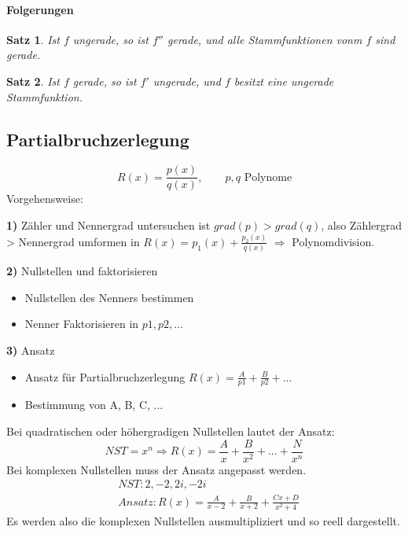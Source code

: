 \documentclass[12pt,a4paper]{article}%
\let\harvardleftorig\harvardleft
\newtheorem{satz}{Satz}[section]
\numberwithin{equation}{section}
\newcommand{\subsubsubsection}{\paragraph}
\newcommand\citevgl
{\def\harvardleft{(vgl.\ \global\let\harvardleft\harvardleftorig}%
 \cite
}
\numberwithin{equation}{subsection}
\begin{document}
\subsubsubsection{Folgerungen}
\begin{satz}
Ist $f$ ungerade, so ist $f''$ gerade, und alle Stammfunktionen vonm $f$ sind gerade.\citevgl{HM2Vortragsubung}
\end{satz}
\begin{satz}
Ist $f$ gerade, so ist $f'$ ungerade, und $f$ besitzt eine ungerade Stammfunktion.\citevgl{HM2Vortragsubung}
\end{satz}

\subsection{Partialbruchzerlegung}
	\begin{equation}
	  R(x) = \frac{p(x)}{q(x)}, \qquad p,q\text{ Polynome}
	\end{equation}
	Vorgehensweise:
	\begin{description}
	  \item{\textbf{1)}} Zähler und Nennergrad untersuchen\newline
	  ist $grad(p) > grad(q)$, also Zählergrad > Nennergrad umformen in  \newline$R(x) = p_1(x) + \frac{p_2(x)}{q(x)}$ $\Rightarrow$ Polynomdivision.
	  \item{\textbf{2)}} Nullstellen und faktorisieren
	    \begin{itemize}
	      \item Nullstellen des Nenners bestimmen
	      \item Nenner Faktorisieren in $p1, p2, ...$
	    \end{itemize}
	  \item{\textbf{3)}} Ansatz
	    \begin{itemize}
	      \item Ansatz für Partialbruchzerlegung $R(x) = \frac{A}{p1} + \frac{B}{p2} + ...$
	      \item Bestimmung von A, B, C, ...
	    \end{itemize}
	\end{description}
  Bei quadratischen oder höhergradigen Nullstellen lautet der Ansatz:
  \begin{equation}
    NST = x^n \Rightarrow R(x) = \frac{A}{x} + \frac{B}{x^2} + ... + \frac{N}{x^n}
  \end{equation}
  Bei komplexen Nullstellen muss der Ansatz angepasst werden.
  \begin{align}
    &NST: 2, -2, 2i, -2i \nonumber \\
    &Ansatz: R(x) = \frac{A}{x-2} + \frac{B}{x+2} + \frac{Cx + D}{x^2+4}
  \end{align}
  Es werden also die komplexen Nullstellen ausmultipliziert und so reell dargestellt.
  
\end{document}

